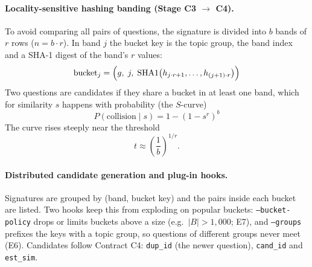 {\paragraph{Locality-sensitive hashing banding (Stage C3 $\to$ C4).}
To avoid comparing all pairs of questions, the signature is divided into $b$ bands of $r$ rows ($n = b \cdot r$).
In band $j$ the bucket key is the topic group, the band index and a SHA-1 digest of the band's $r$ values:
\begin{equation}
  \text{bucket}_j = \Bigl(g,\; j,\; \text{SHA1}\bigl(h_{j \cdot r + 1}, \dots, h_{(j+1) \cdot r}\bigr)\Bigr)
\end{equation}
Two questions are candidates if they share a bucket in at least one band, which for similarity $s$ happens with
probability (the $S$-curve)
\begin{equation}
  P(\text{collision} \mid s) = 1 - (1 - s^r)^b
\end{equation}
The curve rises steeply near the threshold
\begin{equation}
  t \approx \left(\frac{1}{b}\right)^{1/r}.
\end{equation}

\paragraph{Distributed candidate generation and plug-in hooks.}
Signatures are grouped by (band, bucket key) and the pairs inside each bucket are listed. Two hooks keep this from
exploding on popular buckets: \texttt{--bucket-policy} drops or limits buckets above a size (e.g.\ $|B| > 1{,}000$; E7), and
\texttt{--groups} prefixes the keys with a topic group, so questions of different groups never meet (E6).
Candidates follow Contract C4: \texttt{dup\_id} (the newer question), \texttt{cand\_id} and \texttt{est\_sim}.
}

